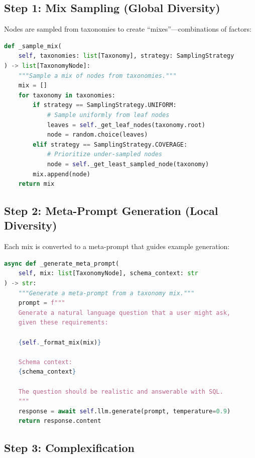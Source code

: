 \documentclass[11pt,a4paper]{article}
\begin{document}
\subsection{Step 1: Mix Sampling (Global Diversity)}

Nodes are sampled from taxonomies to create ``mixes''---combinations of factors:

\begin{lstlisting}[language=Python,caption={Mix sampling (simula\_data\_generator.py, lines 120--150)}]
def _sample_mix(
    self, taxonomies: list[Taxonomy], strategy: SamplingStrategy
) -> list[TaxonomyNode]:
    """Sample a mix of nodes from taxonomies."""
    mix = []
    for taxonomy in taxonomies:
        if strategy == SamplingStrategy.UNIFORM:
            # Sample uniformly from leaf nodes
            leaves = self._get_leaf_nodes(taxonomy.root)
            node = random.choice(leaves)
        elif strategy == SamplingStrategy.COVERAGE:
            # Prioritize under-sampled nodes
            node = self._get_least_sampled_node(taxonomy)
        mix.append(node)
    return mix
\end{lstlisting}

\subsection{Step 2: Meta-Prompt Generation (Local Diversity)}

Each mix is converted to a meta-prompt that guides example generation:

\begin{lstlisting}[language=Python,caption={Meta-prompt generation}]
async def _generate_meta_prompt(
    self, mix: list[TaxonomyNode], schema_context: str
) -> str:
    """Generate a meta-prompt from a taxonomy mix."""
    prompt = f"""
    Generate a natural language question that a user might ask,
    given these requirements:
    
    {self._format_mix(mix)}
    
    Schema context:
    {schema_context}
    
    The question should be realistic and answerable with SQL.
    """
    response = await self.llm.generate(prompt, temperature=0.9)
    return response.content
\end{lstlisting}

\subsection{Step 3: Complexification}
\end{document}
